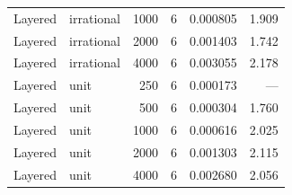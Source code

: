 \begin{longtable}{l l r r r r}
Layered & irrational & 1000 & 6 & 0.000805 & 1.909 \\
Layered & irrational & 2000 & 6 & 0.001403 & 1.742 \\
Layered & irrational & 4000 & 6 & 0.003055 & 2.178 \\
\addlinespace
Layered & unit & 250 & 6 & 0.000173 & --- \\
Layered & unit & 500 & 6 & 0.000304 & 1.760 \\
Layered & unit & 1000 & 6 & 0.000616 & 2.025 \\
Layered & unit & 2000 & 6 & 0.001303 & 2.115 \\
Layered & unit & 4000 & 6 & 0.002680 & 2.056 \\
\end{longtable}
